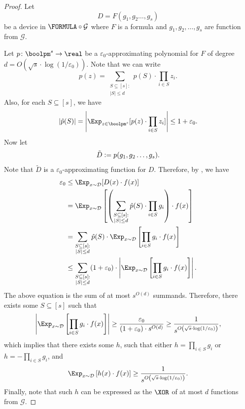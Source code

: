     \begin{proof}
		Let 
		\[
			D = F(g_1,g_2\dots,g_s)
		\]
		be a device in $\FORMULA\circ\mathcal{G}$ where $F$ is a formula and $g_1,g_2,\dots,g_s$ are function from $\mathcal{G}$.

		Let $p\colon\boolpm^s\to\real$ be a $\varepsilon_0$-approximating polynomial for $F$ of degree $d=O(\sqrt{s}\cdot\log(1/\varepsilon_0))$. Note that we can write
		\[
			p(z)=\sum_{\substack{S\subseteq[s]: \\ |S|\leq d}}\hat{p}(S)\cdot\prod_{i\in S}z_i.
		\]
		Also, for each $S\subseteq[s]$, we have
		\[
			|\hat{p}(S)|=\left| \Exp_{z\in\boolpm^s}[p(z)\cdot\prod_{i\in S}z_i] \right| \leq  1+\varepsilon_0.
		\]
		Now let
		\[
			\tilde{D} \vcentcolon= p(g_1,g_2\dots,g_s).
		\]
		Note that $\tilde{D}$ is a $\varepsilon_0$-approximating function for $D$. Therefore, by , we have
		\begin{align*}
			\varepsilon_0 &\leq \Exp_{x\sim\mathcal{D}}[D(x)\cdot f(x)]\\
			&= \Exp_{x\sim\mathcal{D}}\left[\left(\sum_{\substack{S\subseteq[s]: \\ |S|\leq d}}\hat{p}(S)\cdot\prod_{i\in S}g_i \right) \cdot f(x)\right]\\
			&=\sum_{\substack{S\subseteq[s]: \\ |S|\leq d}}\hat{p}(S)\cdot \Exp_{x\sim\mathcal{D}}\left[\prod_{i\in S}g_i\cdot f(x)\right]\\
			&\leq \sum_{\substack{S\subseteq[s]: \\ |S|\leq d}} (1+\varepsilon_0) \cdot \left| \Exp_{x\sim\mathcal{D}}\left[\prod_{i\in S}g_i\cdot f(x)\right] \right|.
		\end{align*}
		The above equation is the sum of at most $s^{O(d)}$ summands. Therefore, there exists some $S\subseteq[s]$ such that
		\[
			\left|\Exp_{x\sim\mathcal{D}}\left[\prod_{i\in S}g_i\cdot f(x)\right]\right| \geq \frac{\varepsilon_0}{(1+\varepsilon_0)\cdot s^{O(d)}}\geq \frac{1}{s^{O\left(\sqrt{s}\cdot\log(1/\varepsilon_0)\right)}},
		\]
		which implies that there exists some $h$, such that either $h=\prod_{i\in S}g_i$ or $h=-\prod_{i\in S}g_i$, and
		\[
			\Exp_{x\sim\mathcal{D}}\left[h(x)\cdot f(x)\right] \geq \frac{1}{s^{O\left(\sqrt{s}\cdot\log(1/\varepsilon_0)\right)}}.
		\]
		Finally, note that such $h$ can be expressed as the $\XOR$ of at most $d$ functions from $\mathcal{G}$.
    \end{proof}
    
